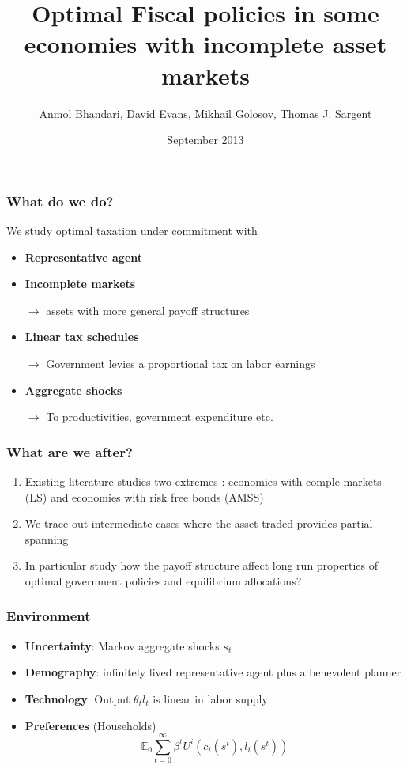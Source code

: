 \documentclass{beamer}
\title { Optimal Fiscal
policies in some economies with incomplete asset markets}
\author{Anmol Bhandari, David Evans, Mikhail Golosov, Thomas J. Sargent}
\date{September 2013}
\begin{document}
%
\begin{frame}
\titlepage

\end{frame}

\begin{frame}
\frametitle{What do we do?}
We study optimal taxation under commitment with
\begin{itemize}
 \item \textbf{Representative agent}

 \item \textbf{Incomplete markets}

 \quad \color{red}$\rightarrow$ \color{black} assets with more general payoff structures

 \item \textbf{Linear tax schedules}

 \quad \color{red}$\rightarrow$ \color{black}Government levies a proportional tax on labor earnings 

 \item \textbf{Aggregate shocks}

 \quad \color{red}$\rightarrow$ \color{black} To productivities, government expenditure etc.

 \end{itemize}
\end{frame}


\begin{frame}
\frametitle{What are we after?}

\begin{enumerate}
\item Existing literature studies two extremes : economies with comple markets (LS) and economies with risk free bonds (AMSS)
\item We trace out intermediate cases where the asset traded provides partial spanning
 \item In particular study how the payoff structure affect long run properties of optimal government policies and equilibrium allocations?
\end{enumerate}

\end{frame}




\begin{frame}
 \frametitle{Environment}
 \begin{itemize}
 \item \textbf{Uncertainty}: Markov aggregate shocks $s_t$
  \item \textbf{Demography}: infinitely lived representative agent plus a benevolent planner
  \item \textbf{Technology}: Output  $\theta_{t} l_{t}$ is linear in labor supply
  \item \textbf{Preferences }(Households)
  \begin{equation*}
\mathbb{E}_{0}\sum_{t=0}^{\infty } \beta^t  U^{i}\left(
c_{i}(s^t),l_{i}(s^t)\right)  \label{utility lifetime}
\end{equation*}%
 \end{itemize}

\end{frame}
\end{document}
